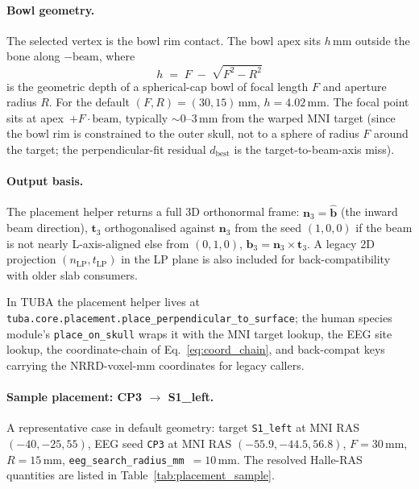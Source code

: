 \documentclass{compactarticle}
\begin{document}
\paragraph{Bowl geometry.}
The selected vertex is the bowl rim contact. The bowl apex sits
$h$\,mm outside the bone along $-\mathrm{beam}$, where
\begin{equation}
h \;=\; F \;-\; \sqrt{F^2 - R^2}
\end{equation}
is the geometric depth of a spherical-cap bowl of focal length $F$ and
aperture radius $R$. For the default $(F, R) = (30, 15)$\,mm,
$h = 4.02$\,mm. The focal point sits at apex~$+ F\cdot\mathrm{beam}$,
typically $\sim$0--3\,mm from the warped MNI target (since the bowl rim
is constrained to the outer skull, not to a sphere of radius $F$ around
the target; the perpendicular-fit residual $d_\mathrm{best}$ is the
target-to-beam-axis miss).

\paragraph{Output basis.}
The placement helper returns a full 3D orthonormal frame:
$\mathbf{n}_3 = \mathbf{\hat b}$ (the inward beam direction),
$\mathbf{t}_3$ orthogonalised against $\mathbf{n}_3$ from the seed
$(1,0,0)$ if the beam is not nearly L-axis-aligned else from $(0,1,0)$,
$\mathbf{b}_3 = \mathbf{n}_3 \times \mathbf{t}_3$. A legacy 2D
projection $(n_\mathrm{LP}, t_\mathrm{LP})$ in the LP plane is also
included for back-compatibility with older slab consumers.

In TUBA the placement helper lives at
\texttt{tuba.core.placement.place\_perpendicular\_to\_surface}; the
human species module's \texttt{place\_on\_skull} wraps it with the MNI
target lookup, the EEG site lookup, the coordinate-chain of
Eq.~\ref{eq:coord_chain}, and back-compat keys carrying the
NRRD-voxel-mm coordinates for legacy callers.

\paragraph{Sample placement: CP3 $\rightarrow$ S1\_left.}
A representative case in default geometry: target \texttt{S1\_left} at
MNI RAS $(-40, -25, 55)$, EEG seed \texttt{CP3} at MNI RAS
$(-55.9, -44.5, 56.8)$, $F=30$\,mm, $R=15$\,mm,
\texttt{eeg\_search\_radius\_mm}~$=10$\,mm. The resolved Halle-RAS
quantities are listed in Table~\ref{tab:placement_sample}.
\end{document}
